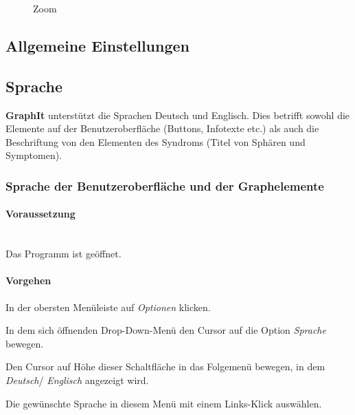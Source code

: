 \documentclass[enabledeprecatedfontcommands,fontsize=11pt,paper=a4,twoside]{scrartcl}
\newcounter{one}
\newcommand*{\condition}{\paragraph{Voraussetzung}$\;$ \vspace{0.2cm}\\}
\newcommand*{\action}{\paragraph{Vorgehen}}
\let\origenumerate\enumerate
\let\origendenumerate\endenumerate
\renewenvironment{enumerate}{\origenumerate \addtolength{\itemsep}{-10.0pt}}{\origendenumerate}
\begin{document}
 		\begin{figure}[ht!]
 			\centering
 			\caption{Zoom}
 		\end{figure}
		
\subsection{Allgemeine Einstellungen} \label{settings}
	
\subsection{Sprache}
\textbf{GraphIt} unterstützt die Sprachen Deutsch und Englisch. Dies betrifft sowohl die Elemente auf der Benutzeroberfläche (Buttons, Infotexte etc.) als auch die Beschriftung von den Elementen des Syndroms (Titel von Sphären und Symptomen).\\
	
\newpage
\subsubsection{Sprache der Benutzeroberfläche und der Graphelemente}
		\condition 	
		Das Programm ist geöffnet.
		\action
		\begin{enumerate}
				\item In der obersten Menüleiste auf \textit{Optionen} klicken. 
				\item In dem sich öffnenden Drop-Down-Menü den Cursor auf die Option \textit{Sprache} bewegen.
				\item Den Cursor auf Höhe dieser Schaltfläche in das Folgemenü bewegen, in dem \textit{Deutsch}/ \textit{Englisch} angezeigt wird.
				\item Die gewünschte Sprache in diesem Menü mit einem Links-Klick auswählen.\\
		\end{enumerate}
\end{document}
